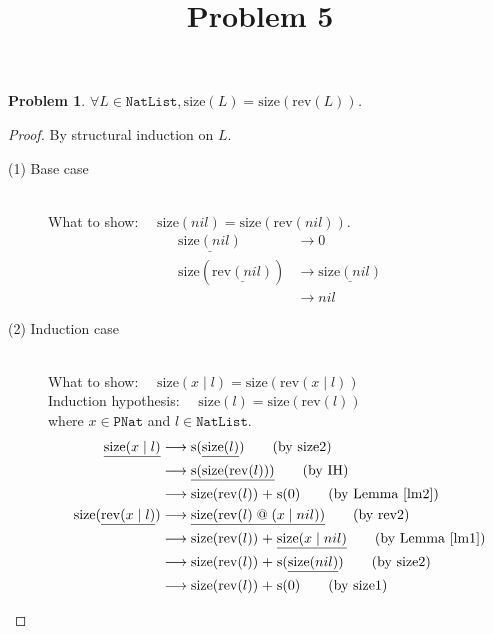 \documentclass[12pt, a4paper]{article}
\title{Problem 5}
\date{\vspace{-5ex}}
\newtheorem{problem}{Problem}
\newcommand{\rel}[1]{\mathrel{#1}}
\newcommand{\rmx}[1]{\mathrm{#1}}
\newcommand{\larrow}{\longrightarrow}
\newcommand{\under}{\underline}
\begin{document}
\maketitle

\begin{problem}
$\forall L \in \mathtt{NatList}, \rmx{size}(L) = \rmx{size}(\rmx{rev}(L))$.
\end{problem}
\begin{proof}
By structural induction on $L$.

\begin{description}
\item[(1) Base case]~\\
\noindent
What to show: $\quad \rmx{size}(nil) = \rmx{size}(\rmx{rev}(nil))$.
\begin{align*}
\under{\rmx{size}(nil)}
	&\larrow 0 \tag{by size1} \\
\rmx{size}(\under{\rmx{rev}(nil)})
	&\larrow \under{\rmx{size}(nil)} \tag{by rev1} \\
	&\larrow nil \tag{by size1}
\end{align*}

\item[(2) Induction case]~\\
What to show: $\quad \rmx{size}(x \rel{|} l) = \rmx{size}(\rmx{rev}(x \rel{|} l))$ \\
Induction hypothesis: $\quad \rmx{size}(l) = \rmx{size}(\rmx{rev}(l))$  \\
where $x \in \mathtt{PNat}$ and $l \in \mathtt{NatList}$.
\begin{align*}
\under{\rmx{size}(x \rel{|} l)}
	&\larrow \rmx{s}(\under{\rmx{size}(l)}) \tag{by size2} \\
	&\larrow \under{\rmx{s}(\rmx{size}(\rmx{rev}(l)))} \tag{by IH} \\
	&\larrow \rmx{size}(\rmx{rev}(l)) \rel{+} \rmx{s}(0) \tag{by Lemma~\ref{lm2}} \\
\rmx{size}(\under{\rmx{rev}(x \rel{|} l)})
	&\larrow \under{\rmx{size}(\rmx{rev}(l) \rel{@} (x \rel{|} nil))} \tag{by rev2} \\
	&\larrow \rmx{size}(\rmx{rev}(l)) \rel{+} \under{\rmx{size}(x \rel{|} nil)} \tag{by Lemma~\ref{lm1}} \\
	&\larrow \rmx{size}(\rmx{rev}(l)) \rel{+} \rmx{s}(\under{\rmx{size}(nil)}) \tag{by size2} \\
	&\larrow \rmx{size}(\rmx{rev}(l)) \rel{+} \rmx{s}(0) \tag{by size1}
\end{align*}

\end{description}

\end{proof}
\end{document}

